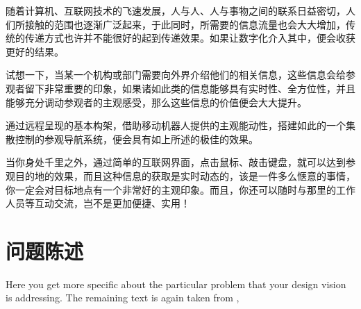 

随着计算机、互联网技术的飞速发展，人与人、人与事物之间的联系日益密切，人们所接触的范围也逐渐广泛起来，于此同时，所需要的信息流量也会大大增加，传统的传递方式也许并不能很好的起到传递效果。如果让数字化介入其中，便会收获更好的结果。

试想一下，当某一个机构或部门需要向外界介绍他们的相关信息，这些信息会给参观者留下非常重要的印象，如果诸如此类的信息能够具有实时性、全方位性，并且能够充分调动参观者的主观感受，那么这些信息的价值便会大大提升。

通过远程呈现的基本构架，借助移动机器人提供的主观能动性，搭建如此的一个集散控制的参观导航系统，便会具有如上所述的极佳的效果。

当你身处千里之外，通过简单的互联网界面，点击鼠标、敲击键盘，就可以达到参观目的地的效果，而且这种信息的获取是实时动态的，该是一件多么惬意的事情，你一定会对目标地点有一个非常好的主观印象。而且，你还可以随时与那里的工作人员等互动交流，岂不是更加便捷、实用！

\section{问题陈述}
\label{sec:problem}

\begin{remark} \color{blue}
Here you get more specific about the particular problem that your design vision is addressing.
The remaining text is again taken from \cite{Autodesk2008Fall},
\normalcolor
\end{remark}

